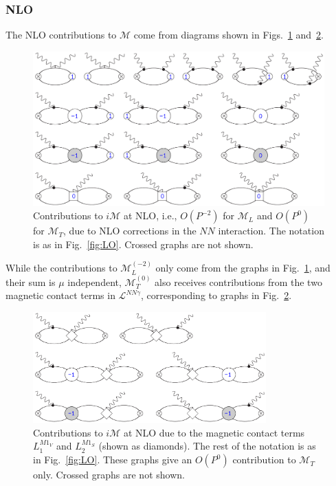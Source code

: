 \documentclass[prl,
twocolumn,
showpacs,preprintnumbers,amsmath,amssymb,
superscriptaddress,
a4paper,nofootinbib,longbibliography]{revtex4-2}
\begin{document}
\subsubsection{NLO}
The NLO contributions to $\mathcal{M}$ come from diagrams shown in Figs.~\ref{fig:NLO} and~\ref{fig:NLO_CT}.
\begin{figure}[htb]
    \centering
    \includegraphics[width=\textwidth]{figs/VVCS_NLO.pdf}
    \caption{Contributions to $i\mathcal{M}$ at NLO, i.e., $O(P^{-2})$ for $\mathcal{M}_L$ and $O(P^0)$ for $\mathcal{M}_T$, due to NLO corrections in the $NN$ interaction. The notation is as in Fig.~\ref{fig:LO}. Crossed graphs are not shown.}
    \label{fig:NLO}
\end{figure}
While the contributions to $\mathcal{M}_{L}^{(-2)}$ only come from the graphs in Fig.~\ref{fig:NLO}, and their sum is $\mu$ independent, $\mathcal{M}_{T}^{(0)}$ also receives contributions from the
two magnetic contact terms in $\mathcal{L}^{NN\gamma}$, corresponding to graphs in Fig.~\ref{fig:NLO_CT}. 
\begin{figure}[htb]
    \centering
    \includegraphics[width=0.8\textwidth]{figs/VVCS_NLO_CT.pdf}
    \caption{Contributions to $i\mathcal{M}$ at NLO due to the magnetic contact terms $L_1^{M1_V}$ and $L_2^{M1_S}$ (shown as diamonds). The rest of the notation is as in Fig.~\ref{fig:LO}. These graphs give an $O(P^0)$ contribution to $\mathcal{M}_T$ only. Crossed graphs are not shown.}
    \label{fig:NLO_CT}
\end{figure}
\end{document}
